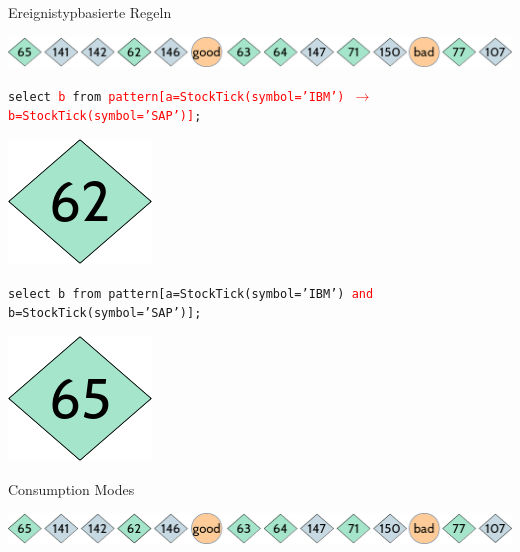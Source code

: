 \documentclass{beamer}
\begin{document}
\begin{frame}{Ereignistypbasierte Regeln}
\begin{center}
    \includegraphics[scale=0.4]{img/stream-2}
\end{center}

\begin{exampleblock}{}
    \begin{center}
    \texttt{select \textcolor{red}{b} from 
    \textcolor{red}{pattern[a=StockTick(symbol='IBM') $\rightarrow$ 
    b=StockTick(symbol='SAP')]};}
\end{center}
\end{exampleblock}
\begin{center}
    \includegraphics[scale=0.25]{img/solution-a}
\end{center}

\begin{exampleblock}{}
\begin{center}
    \texttt{select b from pattern[a=StockTick(symbol='IBM') \textcolor{red}{and} 
    b=StockTick(symbol='SAP')];}
\end{center}
\end{exampleblock}
\begin{center}
    \includegraphics[scale=0.25]{img/solution-b}
\end{center}
\end{frame}

\begin{frame}{Consumption Modes}
\begin{center}
    \includegraphics[scale=0.4]{img/stream-2}
\end{center}



\end{frame}
\end{document}
